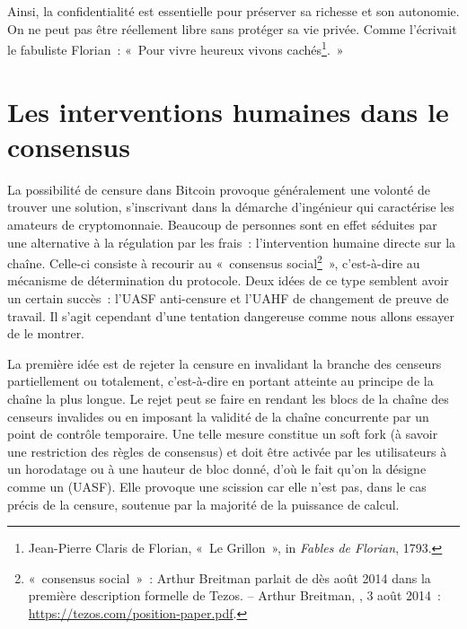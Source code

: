 Ainsi, la confidentialité est essentielle pour préserver sa richesse et son autonomie. On ne peut pas être réellement libre sans protéger sa vie privée. Comme l'écrivait le fabuliste Florian~: «~Pour vivre heureux vivons cachés\footnote{Jean-Pierre Claris de Florian, «~Le Grillon~», in \emph{Fables de Florian}, 1793.}.~»

\section*{Les interventions humaines dans le consensus}

La possibilité de censure dans Bitcoin provoque généralement une volonté de trouver une solution, s'inscrivant dans la démarche d'ingénieur qui caractérise les amateurs de cryptomonnaie. Beaucoup de personnes sont en effet séduites par une alternative à la régulation par les frais~: l'intervention humaine directe sur la chaîne. Celle-ci consiste à recourir au «~consensus social\footnote{«~consensus social~»~: Arthur Breitman parlait de  dès août 2014 dans la première description formelle de Tezos. -- Arthur Breitman, , 3 août 2014~: \url{https://tezos.com/position-paper.pdf}.}~», c'est-à-dire au mécanisme de détermination du protocole. Deux idées de ce type semblent avoir un certain succès~: l'UASF anti-censure et l'UAHF de changement de preuve de travail. Il s'agit cependant d'une tentation dangereuse comme nous allons essayer de le montrer.



La première idée est de rejeter la censure en invalidant la branche des censeurs partiellement ou totalement, c'est-à-dire en portant atteinte au principe de la chaîne la plus longue. Le rejet peut se faire en rendant les blocs de la chaîne des censeurs invalides ou en imposant la validité de la chaîne concurrente par un point de contrôle temporaire. Une telle mesure constitue un soft fork (à savoir une restriction des règles de consensus) et doit être activée par les utilisateurs à un horodatage ou à une hauteur de bloc donné, d'où le fait qu'on la désigne comme un  (UASF). Elle provoque une scission car elle n'est pas, dans le cas précis de la censure, soutenue par la majorité de la puissance de calcul.

